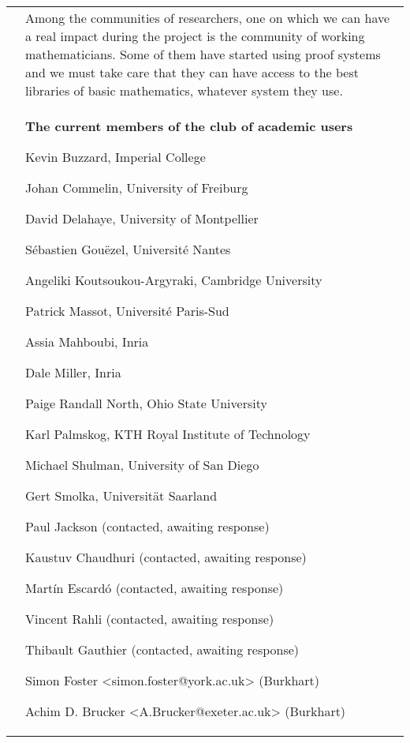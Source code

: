 \begin{longtable}{|p{}|p{}|}
&
\hspace{0.4cm}
Among the communities of researchers, one on which we can have a real
impact during the project is the community of working mathematicians.
Some of them have started using proof systems and we must take care that they
can have access to the best libraries of basic mathematics, whatever system
they use.\\
&
\begin{framed}
\begin{center}
  {\bf \Large The current members of the club of academic users}
\end{center}

\begin{compactitem}
\item Kevin Buzzard, Imperial College %
\item Johan Commelin, University of Freiburg
\item David Delahaye, University of Montpellier %
\item Sébastien Gouëzel, Université Nantes %
\item Angeliki Koutsoukou-Argyraki, Cambridge University %
\item Patrick Massot, Université Paris-Sud %
\item Assia Mahboubi, Inria %
\item Dale Miller, Inria
\item Paige Randall North, Ohio State University
\item Karl Palmskog,  KTH Royal Institute of Technology %
\item Michael Shulman, University of San Diego
\item Gert Smolka, Universität Saarland %



\item Paul Jackson (contacted, awaiting response)
\item Kaustuv Chaudhuri (contacted, awaiting response)
\item Martín Escardó (contacted, awaiting response)
\item Vincent Rahli (contacted, awaiting response)
\item Thibault Gauthier (contacted, awaiting response)

\item Simon Foster <simon.foster@york.ac.uk> (Burkhart)
\item Achim D. Brucker <A.Brucker@exeter.ac.uk> (Burkhart)


\end{compactitem}
\end{framed}
\end{longtable}
